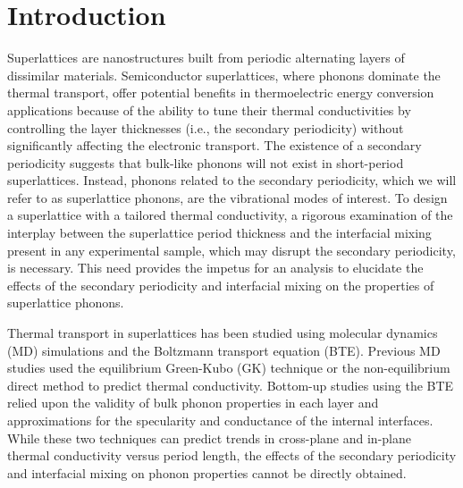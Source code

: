 \documentclass[aps,prb,preprint,preprintnumbers,amsmath,amssymb,floatfix,superscriptaddress]{revtex4}
\begin{document}
\section{Introduction}

Superlattices are nanostructures built from periodic alternating layers of dissimilar materials. Semiconductor superlattices, where phonons dominate the thermal transport, offer potential benefits in thermoelectric energy conversion applications because of the ability to tune their thermal conductivities by controlling the layer thicknesses (i.e., the secondary periodicity) without significantly affecting the electronic transport.\cite{broido1995effect,balandin2003mechanism,kim2006thermal} The existence of a secondary periodicity suggests that bulk-like phonons will not exist in short-period superlattices. Instead, phonons related to the secondary periodicity, which we will refer to as superlattice phonons, are the vibrational modes of interest. To design a superlattice with a tailored thermal conductivity, a rigorous examination of the interplay between the superlattice period thickness and the interfacial mixing present in any experimental sample, which may disrupt the secondary periodicity, is necessary. This need provides the impetus for an analysis to elucidate the effects of the secondary periodicity and interfacial mixing on the properties of superlattice phonons. 

Thermal transport in superlattices has been studied using molecular dynamics (MD) simulations and the Boltzmann transport equation (BTE). Previous MD studies used the equilibrium Green-Kubo (GK) \cite {PhysRevB.85.195302,PhysRevB.77.184302} technique or the non-equilibrium \cite{PhysRevB.77.184302,PhysRevB.79.214307,PhysRevB.72.174302,PhysRevB.79.075316} direct method to predict thermal conductivity. Bottom-up studies using the BTE relied upon the validity of bulk phonon properties in each layer\cite{walkauskas:2579,chen:220} and approximations for the specularity and conductance of the internal interfaces.\cite{PhysRevB.57.14958} While these two techniques can predict trends in cross-plane and in-plane thermal conductivity versus period length, the effects of the secondary periodicity and interfacial mixing on phonon properties cannot be directly obtained.
\end{document}
